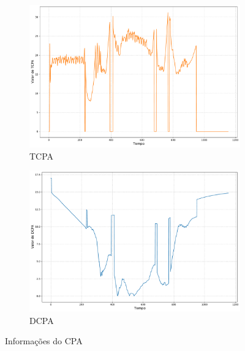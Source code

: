             \begin{figure}[H]
    		\centering
            \begin{subfigure}{1\textwidth}
                \centering
                \includegraphics[width=\textwidth]{fig/chap5/crossing_right_stopped_vessel_cpa_tcpa.pdf}
                \caption{TCPA}
                \label{fig:chap5_crossing_right_stopped_vessel_cpa_tcpa}
            \end{subfigure}
            \begin{subfigure}{1\textwidth}
                \centering
                \includegraphics[width=\textwidth]{fig/chap5/crossing_right_stopped_vessel_cpa_dcpa.pdf}
                \caption{DCPA}
                \label{fig:chap5_crossing_right_stopped_vessel_cpa_dcpa}
            \end{subfigure}
            
            \caption{Informações do CPA}
            \label{fig:chap5_crossing_right_stopped_vessel_cpa}
            \end{figure}
            
